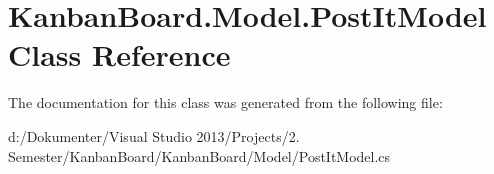 \hypertarget{class_kanban_board_1_1_model_1_1_post_it_model}{}\section{Kanban\+Board.\+Model.\+Post\+It\+Model Class Reference}
\label{class_kanban_board_1_1_model_1_1_post_it_model}


The documentation for this class was generated from the following file\+:\begin{DoxyCompactItemize}
\item 
d\+:/\+Dokumenter/\+Visual Studio 2013/\+Projects/2. Semester/\+Kanban\+Board/\+Kanban\+Board/\+Model/Post\+It\+Model.\+cs\end{DoxyCompactItemize}
